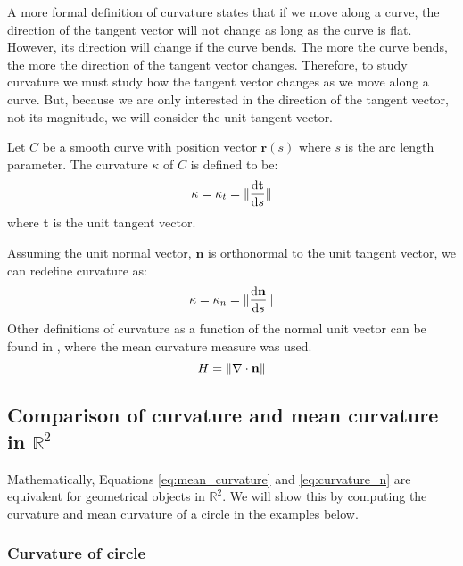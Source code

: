 A more formal definition of curvature states that if we move along a curve, the direction of the tangent vector will not change as long as the curve is flat. However, its direction will change if the curve bends. The more the curve bends, the more the direction of the tangent vector changes. Therefore, to study curvature we must study how the tangent vector changes as we move along a curve. But, because we are only interested in the direction of the tangent vector, not its magnitude, we will consider the unit tangent vector.

Let $C$ be a smooth curve with position vector $\mathbf{r}(s)$ where $s$ is the arc length parameter. The curvature $\kappa$ of $C$ is defined to be:
%
\begin{equation}
	\centering
	\label{eq:curvature_t}
	\kappa = \kappa_{t} = \Vert \frac{\mathrm{d} \mathbf{t}}{\mathrm{d}s} \Vert
\end{equation}
%
where $\mathbf{t}$ is the unit tangent vector.

Assuming the unit normal vector, $\mathbf{n}$ is orthonormal to the unit tangent vector, we can redefine curvature as:
%
\begin{equation}
	\centering
	\label{eq:curvature_n}
	\kappa = \kappa_{n} = \Vert \frac{\mathrm{d} \mathbf{n}}{\mathrm{d}s} \Vert
\end{equation}
%
Other definitions of curvature as a function of the normal unit vector can be found in \citep{WW:05,WW:04c,LLC+:08a}, where the mean curvature measure was used.
%
\begin{equation}
	\centering
	\label{eq:mean_curvature}
	H = \Vert \nabla \cdot \mathbf{n} \Vert
\end{equation}
%

\subsection{Comparison of curvature and mean curvature in $\mathbb{R}^2$}
\label{sec:comparison_curvature_mean_curvature}

Mathematically, Equations \ref{eq:mean_curvature} and \ref{eq:curvature_n} are equivalent for geometrical objects in $\mathbb{R}^2$. We will show this by computing the curvature and mean curvature of a circle in the examples below.

\subsubsection{Curvature of circle}
\label{sec:curvature_circle}

